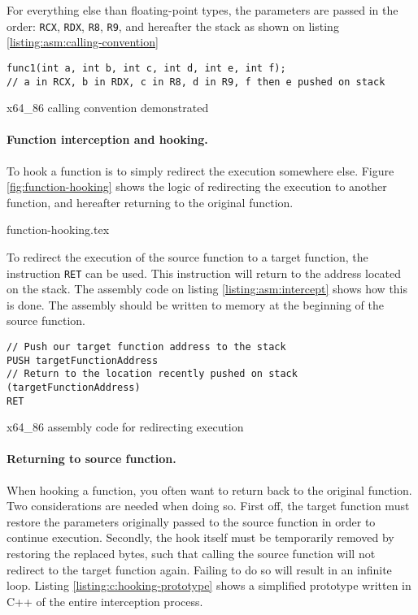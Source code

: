 \documentclass{report}
\begin{document}
For everything else than floating-point types, the parameters are passed in the order: \texttt{RCX}, \texttt{RDX}, \texttt{R8}, \texttt{R9}, and hereafter the stack as shown on listing \ref{listing:asm:calling-convention}

\begin{listing}[H]
\begin{verbatim}
func1(int a, int b, int c, int d, int e, int f);
// a in RCX, b in RDX, c in R8, d in R9, f then e pushed on stack
\end{verbatim}
\caption{x64\_86 calling convention demonstrated\cite{url:hooking:asm:calling-convention:x64}}
\label{listing:asm:calling-convention}
\end{listing}

\paragraph{Function interception and hooking.} To hook a function is to simply redirect the execution somewhere else. Figure \ref{fig:function-hooking} shows the logic of redirecting the execution to another function, and hereafter returning to the original function.

{function-hooking.tex}

To redirect the execution of the source function to a target function, the instruction \texttt{RET}\cite{url:hooking:asm:ret} can be used. This instruction will return to the address located on the stack. The assembly code on listing \ref{listing:asm:intercept} shows how this is done. The assembly should be written to memory at the beginning of the source function.

\begin{listing}[H]
\begin{verbatim}
// Push our target function address to the stack
PUSH targetFunctionAddress
// Return to the location recently pushed on stack (targetFunctionAddress)
RET
\end{verbatim}
\caption{x64\_86 assembly code for redirecting execution}
\label{listing:asm:intercept}
\end{listing}

\paragraph{Returning to source function.} When hooking a function, you often want to return back to the original function. Two considerations are needed when doing so. First off, the target function must restore the parameters originally passed to the source function in order to continue execution. Secondly, the hook itself must be temporarily removed by restoring the replaced bytes, such that calling the source function will not redirect to the target function again. Failing to do so will result in an infinite loop. Listing \ref{listing:c:hooking-prototype} shows a simplified prototype written in C++ of the entire interception process.
\end{document}

